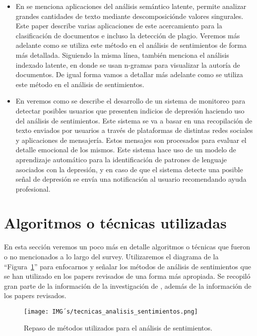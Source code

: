 \documentclass[12pt, conference]{IEEEtran}
\begin{document}
\begin{itemize}
 \item En \cite{f7} se menciona aplicaciones del análisis semántico latente, permite analizar grandes cantidades de texto mediante descomposiciónde valores singurales. Este paper describe varias aplicaciones de este acercamiento para la clasificación de documentos e incluso la detección de plagio. Veremos más adelante como se utiliza este método en el análisis de sentimientos de forma más detallada. Siguiendo la misma línea, \cite{f10} también menciona el análisis indexado latente, en donde se usan n-gramas para visualizar la autoría de documentos. De igual forma vamos a detallar más adelante como se utiliza este método en el análisis de sentimientos.
 \item En \cite{f11} veremos como se describe el desarrollo de un sistema de monitoreo para detectar posibles usuarios que presenten indicios de depresión haciendo uso del análisis de sentimientos. Este sistema se va a basar en una recopilación de texto enviados por usuarios a través de plataformas de distintas redes sociales y aplicaciones de mensajería. Estos mensajes son procesados para evaluar el detalle emocional de los mismos. Este sistema hace uso de un modelo de aprendizaje automático para la identificación de patrones de lenguaje asociados con la depresión, y en caso de que el sistema detecte una posible señal de depresión se envía una notificación al usuario recomendando ayuda profesional.

\end{itemize}

\section{Algoritmos o técnicas utilizadas}
En esta sección veremos un poco más en detalle algoritmos o técnicas que fueron o no mencionados a lo largo del survey. Utilizaremos el diagrama de la ``Figura~\ref{fig3}'' para enfocarnos y señalar los métodos de análisis de sentimientos que se han utilizado en los papers revisados de una forma más apropiada. Se recopiló gran parte de la información de la investigación de \cite{f2}, además de la información de los papers revisados.

\begin{figure}[htbp]
  \caption{Repaso de métodos utilizados para el análisis de sentimientos.}
  \centerline{\texttt{[image: IMG´s/tecnicas\_analisis\_sentimientos.png]}}
  \label{fig3}
\end{figure}
\end{document}
